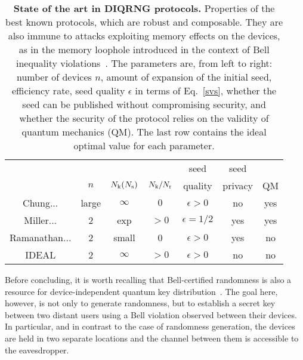 \documentclass[11pt,a4paper]{article}
\begin{document}
\begin{table}[h!]
  \centering
  \label{tab:table1}
  \begin{tabular}{|c||c|c|c|c|c|c|}
    \hline
    &
    &
    &
    & seed
    & seed
    &
    \\     & $n$
    & $N_{\rm k} (N_{\rm s})$
    & $N_{\rm k} /N_{\rm r}$
    & quality
    & privacy
    & QM
    \\ \hline\hline
    Chung...\cite{Chung} &
    large & $\infty$ & $0$ & $\epsilon >0$ & no & yes
    \\ \hline
    Miller...\cite{miller_shi} &
    2 & exp & $>0$ & $\epsilon = 1/2$ & yes & yes
    \\ \hline
    Ramanathan...\cite{RBHHHW 15} &
    2 & small & 0 & $\epsilon >0$ & yes & no \\
    \hline
    IDEAL &
    2 & $\infty$ & $>0$ & $\epsilon >0$ & no & no \\
    \hline
  \end{tabular}
    \caption{{\bf State of the art in DIQRNG protocols.} Properties of the best known protocols, which are robust and composable. They are also immune to attacks exploiting memory effects on the devices, as in the memory loophole introduced in the context of Bell inequality violations~\cite{memory}. The parameters are, from left to right: number of devices $n$, amount of expansion of the initial seed, efficiency rate, seed quality $\epsilon$ in terms of Eq.~\eqref{svs}, whether the seed can be published without compromising security, and whether the security of the protocol relies on the validity of quantum mechanics (QM). The last row contains the ideal optimal value for each parameter.
%
}
\end{table}


Before concluding, it is worth recalling that Bell-certified randomness is also a resource for device-independent quantum key distribution~\cite{BHK05, bkp, EATQKD, Mayers, AGM, acinprl, Masanes, pironio09, hr, MPA, nonfinished, BCK12, RUV12a,BCK12a,VV12}. The goal here, however, is not only to generate randomness, but to establish a secret key between two distant users using a Bell violation observed between their devices. In particular, and in contrast to the case of randomness generation, the devices are held in two separate locations and the channel between them is accessible to the eavesdropper.
%
\end{document}
